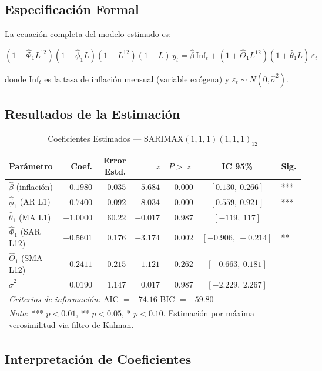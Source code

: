 \documentclass[12pt, letterpaper]{article}
\begin{document}
\subsection{Especificación Formal}

La ecuación completa del modelo estimado es:

\[
(1 - \hat\Phi_1 L^{12})(1-\hat\phi_1 L)(1-L^{12})(1-L)\,y_t
= \hat\beta\,\text{Inf}_t + (1+\hat\Theta_1 L^{12})(1+\hat\theta_1 L)\,\varepsilon_t
\]

donde $\text{Inf}_t$ es la tasa de inflación mensual (variable exógena) y $\varepsilon_t \sim N(0,\hat\sigma^2)$.

\subsection{Resultados de la Estimación}

\begin{table}[H]
\centering
\caption{Coeficientes Estimados — SARIMAX$(1,1,1)(1,1,1)_{12}$}
\label{tab:coef}
\begin{tabular}{lrrrrcl}
\toprule
\textbf{Parámetro} & \textbf{Coef.} & \textbf{Error Estd.} & \textbf{$z$} & \textbf{$P>|z|$} & \textbf{IC 95\%} & \textbf{Sig.} \\
\midrule
$\hat\beta$ (inflación)  & $0.1980$  & $0.035$ & $5.684$ & $0.000$ & $[0.130,\ 0.266]$ & *** \\
$\hat\phi_1$ (AR L1)     & $0.7400$  & $0.092$ & $8.034$ & $0.000$ & $[0.559,\ 0.921]$ & *** \\
$\hat\theta_1$ (MA L1)   & $-1.0000$ & $60.22$ & $-0.017$& $0.987$ & $[-119,\ 117]$    & \\
$\hat\Phi_1$ (SAR L12)   & $-0.5601$ & $0.176$ & $-3.174$& $0.002$ & $[-0.906,\ -0.214]$ & ** \\
$\hat\Theta_1$ (SMA L12) & $-0.2411$ & $0.215$ & $-1.121$& $0.262$ & $[-0.663,\ 0.181]$ & \\
$\hat\sigma^2$            & $0.0190$  & $1.147$ & $0.017$ & $0.987$ & $[-2.229,\ 2.267]$ & \\
\midrule
\multicolumn{7}{l}{\textit{Criterios de información:} AIC $= -74.16$ \quad BIC $= -59.80$} \\
\bottomrule
\multicolumn{7}{p{13.5cm}}{\small \textit{Nota}: *** $p<0.01$, ** $p<0.05$, * $p<0.10$. Estimación por máxima verosimilitud via filtro de Kalman.}
\end{tabular}
\end{table}

\subsection{Interpretación de Coeficientes}
\end{document}
